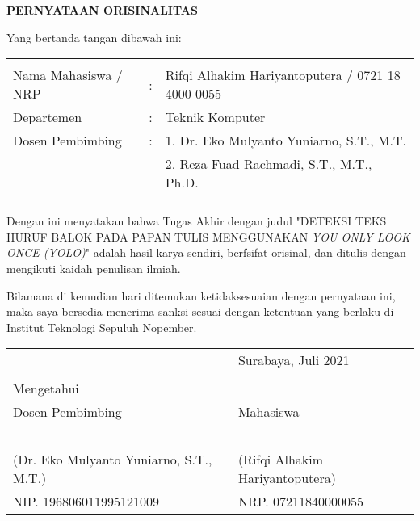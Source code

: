 \begin{center}
  \large
  \textbf{PERNYATAAN ORISINALITAS}
\end{center}

\thispagestyle{empty}

\vspace{2ex}


\noindent Yang bertanda tangan dibawah ini:

\noindent\begin{tabularx}{\textwidth}{X l l}
  & & \\
  Nama Mahasiswa / NRP &: & Rifqi Alhakim Hariyantoputera / 0721 18 4000 0055 \\
  Departemen &: & Teknik Komputer \\
  Dosen Pembimbing &: & 1. Dr. Eko Mulyanto Yuniarno, S.T., M.T. \\
  & & 2. Reza Fuad Rachmadi, S.T., M.T., Ph.D. \\
  & & \\
\end{tabularx}

Dengan ini menyatakan bahwa Tugas Akhir dengan judul "DETEKSI TEKS HURUF BALOK PADA PAPAN TULIS MENGGUNAKAN \emph{YOU ONLY LOOK ONCE (YOLO)}" adalah hasil karya sendiri, berfsifat orisinal, dan ditulis dengan mengikuti kaidah penulisan ilmiah.

Bilamana di kemudian hari ditemukan ketidaksesuaian dengan pernyataan ini, maka saya bersedia menerima sanksi sesuai dengan ketentuan yang berlaku di Institut Teknologi Sepuluh Nopember.

\vspace{8ex}

\noindent\begin{tabularx}{\textwidth}{X l}
  & Surabaya, Juli 2021\\
  & \\
  Mengetahui & \\
  Dosen Pembimbing & Mahasiswa\\
  & \\
  & \\
  & \\
  & \\
  & \\
  (Dr. Eko Mulyanto Yuniarno, S.T., M.T.) & (Rifqi Alhakim Hariyantoputera) \\
  NIP. 196806011995121009 & NRP. 07211840000055\\
\end{tabularx}
